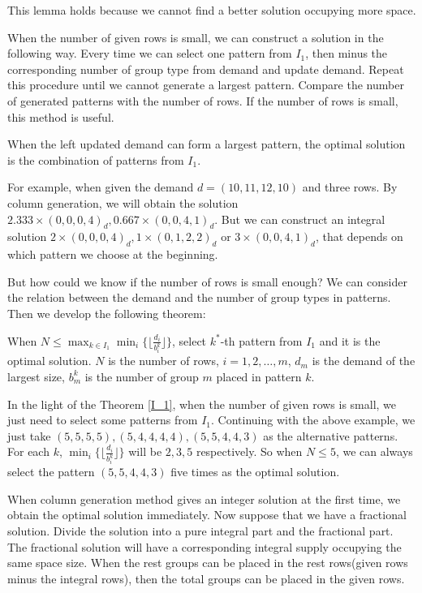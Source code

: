 This lemma holds because we cannot find a better solution occupying more space.

When the number of given rows is small, we can construct a solution in the following way. Every time we can select one pattern from $I_1$, then minus the corresponding number of group type from demand and update demand. Repeat this procedure until we cannot generate a largest pattern. Compare the number of generated patterns with the number of rows. If the number of rows is small, this method is useful.

\begin{corollary}
When the left updated demand can form a largest pattern, the optimal solution is the combination of patterns from $I_1$.
\end{corollary}

For example, when given the demand $d = (10,11,12,10)$ and three rows.
By column generation, we will obtain the solution $2.333 \times (0,0,0,4)_d, 0.667 \times (0,0,4,1)_d$. But we can construct an integral solution $2 \times (0,0,0,4)_d, 1 \times (0,1,2,2)_d$ or $3 \times (0,0,4,1)_d$, that depends on which pattern we choose at the beginning.

But how could we know if the number of rows is small enough?
We can consider the relation between the demand and the number of group types in patterns. Then we develop the following theorem:
\begin{thm}\label{I_1}
  When $N \leq \max_{k\in I_1} \min_{i} \{\lfloor \frac{d_i}{b_i^k}\rfloor\}$, select $k^*$-th pattern from $I_1$ and it is the optimal solution.
  $N$ is the number of rows, $i = 1,2,\ldots, m$, $d_m$ is the demand of the largest size, $b_m^k$ is the number of group $m$ placed in pattern $k$.
\end{thm}

In the light of the Theorem \ref{I_1}, when the number of given rows is small, we just need to select some patterns from $I_1$.
Continuing with the above example, we just take $(5,5,5,5), (5,4,4,4,4), (5,5,4,4,3)$ as the alternative patterns. For each $k$, $\min_{i} \{\lfloor \frac{d_i}{b_i^k}\rfloor\}$ will be $2,3,5$ respectively. So when $N \leq 5$, we can always select the pattern $(5,5,4,4,3)$ five times as the optimal solution.

When column generation method gives an integer solution at the first time, we obtain the optimal solution immediately. Now suppose that we have a fractional solution. Divide the solution into a pure integral part and the fractional part. The fractional solution will have a corresponding integral supply occupying the same space size. When the rest groups can be placed in the rest rows(given rows minus the integral rows), then the total groups can be placed in the given rows.

